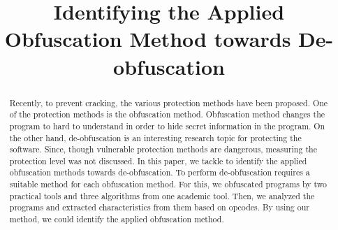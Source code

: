 \documentclass[conference]{IEEEtran}
\begin{document}
\title{Identifying the Applied Obfuscation Method towards De-obfuscation}

\author{
\and
{}
}

\maketitle

\begin{abstract}
  Recently, to prevent cracking, the various protection methods have
  been proposed.  One of the protection methods is the obfuscation
  method. Obfuscation method changes the program to hard to understand
  in order to hide secret information in the program.
  On the other hand, de-obfuscation is an interesting research topic
  for protecting the software.  Since, though vulnerable protection
  methods are dangerous, measuring the protection level was not
  discussed.
  In this paper, we tackle to identify the applied obfuscation
  methods towards de-obfuscation.  To perform de-obfuscation requires
  a suitable method for each obfuscation method.  For this, we
  obfuscated programs by two practical tools and three algorithms
  from one academic tool.  Then, we analyzed the programs and
  extracted characteristics from them based on opcodes.  By using our
  method, we could identify the applied obfuscation method.

\end{abstract}
\end{document}
